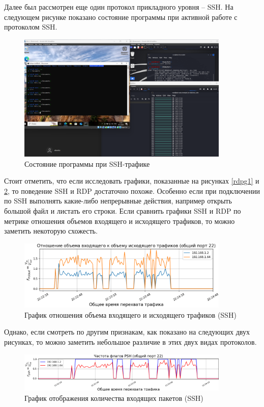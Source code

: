 \documentclass[bachelor, och, coursework]{SCWorks}
\begin{document}
Далее был рассмотрен еще один протокол прикладного уровня -- SSH. На следующем рисунке показано состояние программы при активной работе
с протоколом SSH.

\begin{figure}[H]
  \centering
  \includegraphics[width=0.9\textwidth]{pics/new5.png}
  \caption{Состояние программы при SSH-трафике}
  \label{ssh1}
\end{figure}


Стоит отметить, что если исследовать графики, показанные на рисунках \ref{rdpg1} и \ref{sshg1}, то поведение SSH и RDP достаточно похоже. 
Особенно если при подключении по SSH выполнять какие-либо непрерывные действия, например открыть большой файл и листать его строки. 
Если сравнить графики SSH и RDP по метрике отношения объемов входящего и исходящего трафиков, то можно заметить некоторую схожесть.

\begin{figure}[H]
  \centering
  \includegraphics[width=0.9\textwidth]{pics/newssh1.png}
  \caption{График отношения объема входящего и исходящего трафиков (SSH)}
  \label{sshg1}
\end{figure}

Однако, если смотреть по другим признакам, как показано на следующих двух рисунках, то можно заметить небольшое различие в этих двух видах протоколов.

\begin{figure}[H]
  \centering
  \includegraphics[width=0.9\textwidth]{pics/newssh2.png}
  \caption{График отображения количества входящих пакетов (SSH)}
  \label{sshg2}
\end{figure}
\end{document}
